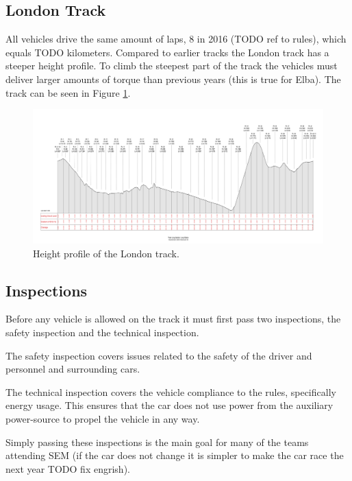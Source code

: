 \subsection{London Track}
All vehicles drive the same amount of laps, 8 in 2016 (TODO ref to rules), which equals TODO kilometers. Compared to earlier tracks the London track has a steeper height profile. To climb the steepest part of the track the vehicles must deliver larger amounts of torque than previous years (this is true for Elba). The track can be seen in Figure \ref{fig:introduction_londontrack}.

\begin{figure}[H]
    \label{fig:introduction_londontrack}
    \centering
    \includegraphics[width=\textwidth]{./img/introduction_londontrack.png}
    \caption{Height profile of the London track.}
\end{figure}

\subsection{Inspections}
Before any vehicle is allowed on the track it must first pass two inspections, the safety inspection and the technical inspection.

The safety inspection covers issues related to the safety of the driver and personnel and surrounding cars. 

The technical inspection covers the vehicle compliance to the rules, specifically energy usage. This ensures that the car does not use power from the auxiliary power-source to propel the vehicle in any way.

Simply passing these inspections is the main goal for many of the teams attending SEM (if the car does not change it is simpler to make the car race the next year TODO fix engrish).

